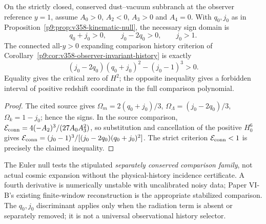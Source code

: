 \documentclass[12pt,a4paper]{article}
\begin{document}
\begin{corollary}
\label{p9:cor:cc14-qj-history}
On the strictly closed, conserved dust--vacuum subbranch at the
observer reference $y=1$, assume $A_0>0$, $A_2<0$, $A_3>0$ and
$A_4=0$.  With $q_0,j_0$ as in
Proposition~\ref{p9:prop:v358-kinematic-null}, the necessary
sign domain is
\[
 \boxed{q_0+j_0>0,\qquad j_0-2q_0>0,\qquad j_0>1.}
\]
The connected all-$y>0$ expanding comparison history criterion of
Corollary~\ref{p9:cor:v358-observer-invariant-history} is exactly
\[
 \boxed{(j_0-2q_0)(q_0+j_0)^2-(j_0-1)^3>0.}
\]
Equality gives the critical zero of $H^2$; the opposite inequality
gives a forbidden interval of positive redshift coordinate in the
full comparison polynomial.
\end{corollary}
\begin{proof}
The cited source gives
$\Omega_m=2(q_0+j_0)/3$,
$\Omega_\Lambda=(j_0-2q_0)/3$,
$\Omega_k=1-j_0$; hence the signs.  In the source comparison,
$\mathcal E_{\rm conn}=4(-A_2)^3/(27A_0A_3^2)$, so substitution
and cancellation of the positive $H_0^6$ gives
$\mathcal E_{\rm conn}=(j_0-1)^3/
[(j_0-2q_0)(q_0+j_0)^2]$.  The strict criterion
$\mathcal E_{\rm conn}<1$ is precisely the claimed inequality.
\end{proof}
\begin{remark}
The Euler null tests the stipulated \emph{separately conserved
comparison family}, not actual cosmic expansion without the
physical-history incidence certificate.  A fourth derivative is
numerically unstable with uncalibrated noisy data; Paper VI-B's
existing finite-window reconstruction is the appropriate stabilized
comparison.  The $q_0,j_0$ discriminant applies only when the
radiation term is absent or separately removed; it is not a
universal observational history selector.
\end{remark}
\end{document}
